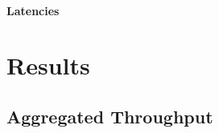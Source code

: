 \documentclass{acmsig}
\begin{document}
\paragraph{Latencies}


\section{Results}

\subsection{Aggregated Throughput}

\end{document}
